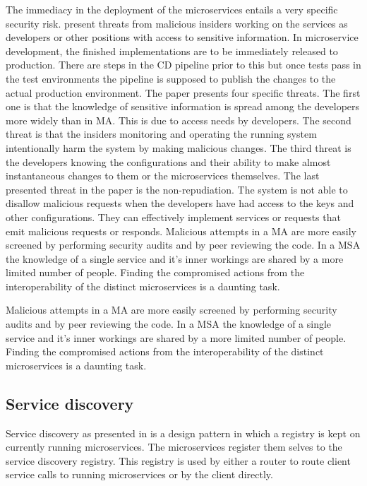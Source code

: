 \begin{sloppypar}
    The immediacy in the deployment of the microservices entails a very specific 
    security risk. \citet{integinside} present threats from malicious insiders 
    working on the services as developers or other positions with access to 
    sensitive information. In microservice development, the finished 
    implementations are to be immediately released to production. There are 
    steps in the CD pipeline prior to this but once tests pass in the test 
    environments the pipeline is supposed to publish the changes to the actual 
    production environment. The paper presents four specific threats. The first 
    one is that the knowledge of sensitive information is spread among the 
    developers more widely than in MA. This is due to access needs by 
    developers. The second threat is that the insiders monitoring and operating 
    the running system intentionally harm the system by making malicious 
    changes. The third threat is the developers knowing the configurations and 
    their ability to make almost instantaneous changes to them or the 
    microservices themselves. The last presented threat in the paper is the 
    non-repudiation. The system is not able to disallow malicious requests when 
    the developers have had access to the keys and other configurations. They 
    can effectively implement services or requests that emit malicious requests 
    or responds. Malicious attempts in a MA are more easily screened by 
    performing security audits and by peer reviewing the code. In a MSA the 
    knowledge of a single service and it’s inner workings are shared by a more 
    limited number of people. Finding the compromised actions from the 
    interoperability of the distinct microservices is a daunting task.
\end{sloppypar}
\begin{sloppypar}
    Malicious attempts in a MA are more easily screened by performing security
    audits and by peer reviewing the code. In a MSA the knowledge of a single 
    service and it's inner workings are shared by a more limited number of people.
    Finding the compromised actions from the interoperability of the distinct 
    microservices is a daunting task.
\end{sloppypar}

\subsection{Service discovery}
\begin{sloppypar}
    Service discovery as presented in \citet{DBLP:journals/corr/MontesiW16} is a 
    design pattern in which a registry is kept on currently running microservices. 
    The microservices register them selves to the service discovery registry. 
    This registry is used by either a router to route client service calls to 
    running microservices or by the client directly.
\end{sloppypar}

